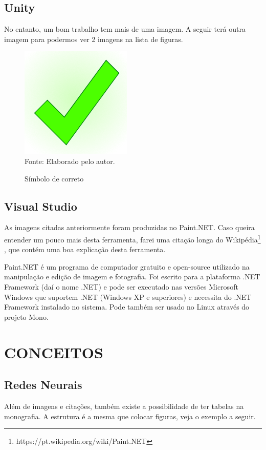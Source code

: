\documentclass[12pt,a4paper]{article}
\newcommand{\source}[1]{Fonte: {#1}}
\begin{document}
	\subsection{Unity}
	No entanto, um bom trabalho tem mais de uma imagem.
	A seguir terá outra imagem para podermos ver 2 imagens na lista de figuras.

\begin{figure}[ht!]
	\label{correto}
	\caption{Símbolo de correto}
	\centering
	\vspace{3mm}
	\includegraphics[scale=0.5]{Okay.png}\\
	\vspace{3mm}
	\source{Elaborado pelo autor.}
\end{figure}

	\subsection{Visual Studio}
	As imagens citadas anteriormente foram produzidas no Paint.NET.
	Caso queira entender um pouco mais desta ferramenta, farei uma citação longa do Wikipédia\footnote{https://pt.wikipedia.org/wiki/Paint.NET}
	, que contém uma boa explicação desta ferramenta.

\begin{longcitation}
	Paint.NET é um programa de computador gratuito e open-source utilizado na manipulação e edição de imagem e fotografia. Foi escrito para a plataforma .NET Framework (daí o nome .NET) e pode ser executado nas versões Microsoft Windows que suportem .NET (Windows XP e superiores) e necessita do .NET Framework instalado no sistema. Pode também ser usado no Linux através do projeto Mono.
\end{longcitation}
	
\section{CONCEITOS}

	\subsection{Redes Neurais}
	Além de imagens e citações, também existe a possibilidade de ter tabelas na monografia.
	A estrutura é a mesma que colocar figuras, veja o exemplo a seguir.
\end{document}
